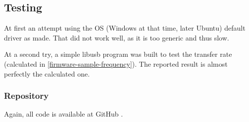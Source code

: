\subsection{Testing}
At first an attempt using the OS (Windows at that time, later Ubuntu) default driver
as made. That did not work well, as it is too generic and thus slow. 

At a second try, a simple libusb \cite{libusb} program was built to test the transfer
rate (calculated in \autoref{firmware-sample-frequency}). The reported result is
almost perfectly the calculated one.

\subsubsection{Repository}
Again, all code is available at GitHub \cite{guitar-digitizer-firmware}.
